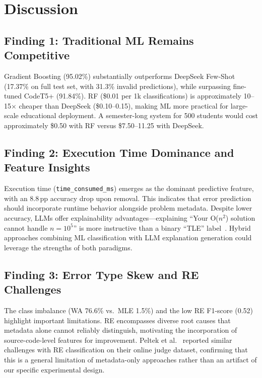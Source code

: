 \documentclass[10pt,a4paper]{article}
\begin{document}
\section{Discussion}

\subsection{Finding 1: Traditional ML Remains Competitive}

Gradient Boosting (95.02\%) substantially outperforms DeepSeek Few-Shot
(17.37\% on full test set, with 31.3\% invalid predictions), while surpassing
fine-tuned CodeT5+ (91.84\%). RF (\$0.01 per 1k classifications) is
approximately 10--15$\times$ cheaper than DeepSeek (\$0.10--0.15), making ML
more practical for large-scale educational deployment. A semester-long system
for 500 students would cost approximately \$0.50 with RF versus \$7.50--11.25
with DeepSeek.

\subsection{Finding 2: Execution Time Dominance and Feature Insights}

Execution time (\texttt{time\_consumed\_ms}) emerges as the dominant
predictive feature, with an 8.8\,pp accuracy drop upon removal. This indicates
that error prediction should incorporate runtime behavior alongside problem
metadata. Despite lower accuracy, LLMs offer explainability
advantages---explaining ``Your O($n^2$) solution cannot handle $n = 10^5$'' is
more instructive than a binary ``TLE'' label~\cite{finnie2022robots}. Hybrid
approaches combining ML classification with LLM explanation generation could
leverage the strengths of both paradigms.

\subsection{Finding 3: Error Type Skew and RE Challenges}

The class imbalance (WA 76.6\% vs.\ MLE 1.5\%) and the low RE F1-score (0.52)
highlight important limitations. RE encompasses diverse root causes that
metadata alone cannot reliably distinguish, motivating the incorporation of
source-code-level features for improvement. Peltek
et al.~\cite{peltek2025classifying} reported similar challenges with RE
classification on their online judge dataset, confirming that this is a
general limitation of metadata-only approaches rather than an artifact of our
specific experimental design.
\end{document}
